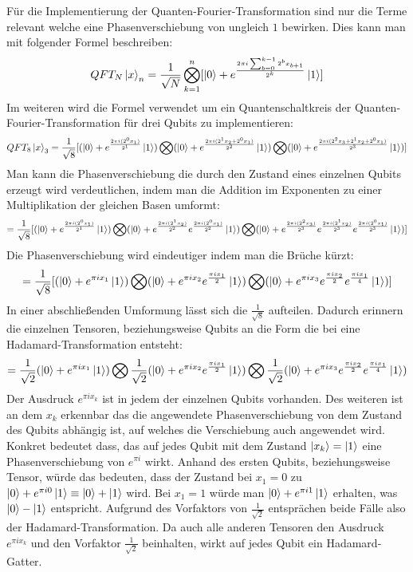Für die Implementierung der Quanten-Fourier-Transformation sind nur die Terme relevant
welche eine Phasenverschiebung von ungleich \(1\) bewirken.
Dies kann man mit folgender Formel beschreiben:
\[QFT_{N}\ket{x}_{n} = \frac{1}{\sqrt{N}}\bigotimes_{k=1}^n [  \ket{0} + { e^{\frac{2 \pi i \sum_{b=0}^{k-1}2^b x_{b+1} }{2^k}}}\ket{1}]\] 
Im weiteren wird die Formel verwendet um ein Quantenschaltkreis der Quanten-Fourier-Transformation für drei Qubits zu implementieren:
\[QFT_{8}\ket{x}_{3} = \frac{1}{\sqrt{8}} [ (\ket{0} + { e^{\frac{2 \pi i (2^0x_1)}{2^1}}}\ket{1} ) \bigotimes
( \ket{0} + { e^{\frac{2 \pi i (2^1x_2+2^0x_1)}{2^2}}}\ket{1} ) \bigotimes
( \ket{0} + { e^{\frac{2 \pi i (2^{2}x_3 +2^1x_2+2^0x_1)}{2^3}}}\ket{1} ) ] \]
Man kann die Phasenverschiebung die durch den Zustand eines einzelnen Qubits erzeugt wird verdeutlichen,
indem man die Addition im Exponenten zu einer Multiplikation der gleichen Basen umformt:
\[ = \frac{1}{\sqrt{8}} [ (\ket{0} + { e^{\frac{2 \pi i (2^0x_1)}{2^1}}}\ket{1}) \bigotimes
( \ket{0} + { e^{\frac{2 \pi i (2^1x_2)}{2^2}} e^{\frac{2 \pi i (2^0x_1)}{2^2}} }\ket{1} ) \bigotimes
( \ket{0} + { e^{\frac{2 \pi i (2^{2}x_3)}{2^3}} e^{\frac{2 \pi i (2^1x_2)}{2^3}} e^{\frac{2 \pi i (2^0x_1)}{2^3}}  }\ket{1} ) ] \]
Die Phasenverschiebung wird eindeutiger indem man die Brüche kürzt:
\[ = \frac{1}{\sqrt{8}} [ ( \ket{0} + e^{\pi i x_1}\ket{1} ) \bigotimes
( \ket{0} + { e^{\pi i x_2} e^{ \frac{ \pi i x_1}{2}} }\ket{1} ) \bigotimes
( \ket{0} + { e^{\pi i x_3} e^{\frac{\pi i x_2}{2}} e^{ \frac{ \pi i x_1}{4}} }\ket{1} ) ] \]
In einer abschließenden Umformung lässt sich die \(\frac{1}{\sqrt8}\) aufteilen.
Dadurch erinnern die einzelnen Tensoren,
beziehungsweise Qubits an die Form die bei eine Hadamard-Transformation entsteht:
\[ = \frac{1}{\sqrt{2}}( \ket{0} + e^{\pi i x_1}\ket{1} ) \bigotimes
\frac{1}{\sqrt{2}}( \ket{0} + { e^{\pi i x_2} e^{ \frac{ \pi i x_1}{2}} }\ket{1} ) \bigotimes
\frac{1}{\sqrt{2}}( \ket{0} + { e^{\pi i x_3} e^{\frac{\pi i x_2}{2}} e^{ \frac{ \pi i x_1}{4}} }\ket{1} )  \]
Der Ausdruck \(e^{\pi i x_k}\) ist in jedem der einzelnen Qubits vorhanden.
Des weiteren ist an dem \(x_k\) erkennbar das die angewendete Phasenverschiebung von dem Zustand des Qubits abhängig ist,
auf welches die Verschiebung auch angewendet wird.
Konkret bedeutet dass, das auf jedes Qubit mit dem Zustand \(\ket{x_k} = \ket{1}\) eine Phasenverschiebung von \(e^{\pi i}\) wirkt.
Anhand des ersten Qubits, beziehungsweise Tensor, würde das bedeuten, dass der Zustand bei \(x_1 = 0\)
zu \(\ket{0} + e^{\pi i 0} \ket{1} \equiv \ket{0} + \ket{1}\) wird.
Bei \(x_1 = 1\) würde man \(\ket{0} + e^{\pi i 1} \ket{1}\) erhalten,
was \(\ket{0} - \ket{1}\) entspricht.
Aufgrund des Vorfaktors von \(\frac{1}{\sqrt{2}}\) entsprächen beide Fälle also der Hadamard-Transformation.
Da auch alle anderen Tensoren den Ausdruck \(e^{\pi i x_k}\) und den Vorfaktor \(\frac{1}{\sqrt{2}}\) beinhalten, wirkt auf jedes Qubit ein Hadamard-Gatter.


